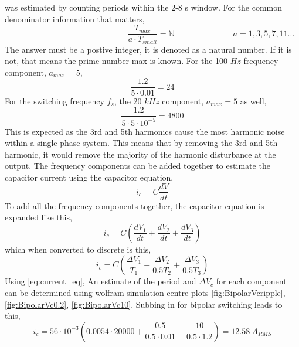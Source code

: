 \documentclass[12pt,twoside]{scrartcl}
\begin{document}
was estimated by counting periods within the 2-8 s window. For the common denominator information that matters,
\begin{equation} 
    \hspace{6cm} \dfrac{T_{max}}{a \cdot T_{small}} = \mathbb{N} \hspace{3cm} a = 1,3,5,7,11 ...
\end{equation}
The answer must be a postive integer, it is denoted as a natural number. 
If it is not, that means the prime number max is known. For the 100 $Hz$ frequency component, $a_{max} = 5$,
\begin{equation}
    \dfrac{1.2}{5 \cdot 0.01} = 24 \tag*{}
\end{equation}
For the switching frequency $f_s$, the 20 $kHz$ component, $a_{max} = 5$ as well,
\begin{equation}
    \dfrac{1.2}{5 \cdot 5 \cdot 10^{-5}} = 4800 \tag*{}
\end{equation}
This is expected as the 3rd and 5th harmonics cause the most harmonic 
noise within a single phase system. This 
means that by removing the 3rd and 
5th harmonic, it would remove the majority of the harmonic disturbance at the output.
\newline
\newline
\noindent
The frequency components can be added together to estimate the capacitor current using the capacitor equation,
\begin{equation}
    i_{c} = C\dfrac{dV}{dt}
\end{equation}
To add all the frequency components together, the capacitor equation is expanded like this,
\begin{equation}
    i_c = C\left(\dfrac{dV_1}{dt} + \dfrac{dV_2}{dt} + \dfrac{dV_3}{dt}\right)
\end{equation}
which when converted to discrete is this,
\begin{equation}
    i_c = C\left(\dfrac{\Delta V_1}{T_1} + \dfrac{\Delta V_2}{0.5T_2} + \dfrac{\Delta V_3}{0.5T_3}\right)
    \label{eq:current_eq}
\end{equation}
Using \ref{eq:current_eq}, An estimate of the period and $\Delta V_c$ for each component can be determined using wolfram simulation centre plots \ref{fig:BipolarVcripple}, \ref{fig:BipolarVc0.2}, \ref{fig:BipolarVc10}. Subbing in for bipolar switching leads to this,
\begin{equation}
    i_c = 56\cdot 10^{-3}\left(0.0054\cdot 20000 + \dfrac{0.5}{0.5 \cdot 0.01} + \dfrac{10}{0.5 \cdot 1.2}\right) = 12.58 \: A_{RMS} \tag*{}
\end{equation}
\end{document}
